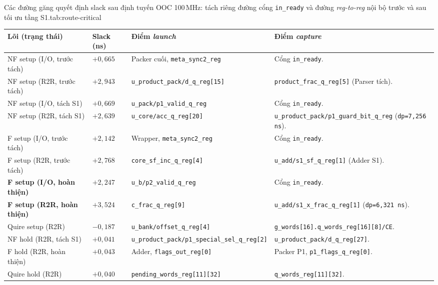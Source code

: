 \begin{engineeringtable}{Các đường găng quyết định slack sau định tuyến OOC 100\,MHz: tách riêng đường cổng \texttt{in\_ready} và đường \textit{reg-to-reg} nội bộ trước và sau tối ưu tầng S1.}{tab:route-critical}
\begin{tabularx}{\linewidth}{@{}>{\raggedright\arraybackslash}p{34mm}>{\raggedright\arraybackslash}p{15mm}Y Y@{}}
\toprule
Lõi (trạng thái) & Slack (ns) & Điểm \textit{launch} & Điểm \textit{capture} \\
\midrule
NF setup (I/O, trước tách) & $+0{,}665$ & Packer cuối, \texttt{meta\_sync2\_reg} & Cổng \texttt{in\_ready}. \\
NF setup (R2R, trước tách) & $+2{,}943$ & \texttt{u\_product\_pack/\allowbreak d\_q\_reg[15]} & \texttt{product\_frac\_\allowbreak q\_reg[5]} (Parser tích). \\
NF setup (I/O, tách S1) & $+0{,}669$ & \texttt{u\_pack/p1\_valid\_\allowbreak q\_reg} & Cổng \texttt{in\_ready}. \\
NF setup (R2R, tách S1) & $+2{,}639$ & \texttt{u\_core/acc\_q\_reg[20]} & \texttt{u\_product\_pack/\allowbreak p1\_guard\_bit\_q\_reg} (\texttt{dp=7,256\,ns}). \\
F setup (I/O, trước tách) & $+2{,}142$ & Wrapper, \texttt{meta\_sync2\_reg} & Cổng \texttt{in\_ready}. \\
F setup (R2R, trước tách) & $+2{,}768$ & \texttt{core\_sf\_\allowbreak inc\_q\_reg[4]} & \texttt{u\_add/\allowbreak s1\_sf\_q\_reg[1]} (Adder S1). \\
\textbf{F setup (I/O, hoàn thiện)} & \textbf{$+2{,}247$} & \texttt{u\_b/p2\_valid\_q\_reg} & Cổng \texttt{in\_ready}. \\
\textbf{F setup (R2R, hoàn thiện)} & \textbf{$+3{,}524$} & \texttt{c\_frac\_q\_reg[9]} & \texttt{u\_add/\allowbreak s1\_x\_frac\_q\_reg[1]} (\texttt{dp=6,321\,ns}). \\
Quire setup (R2R) & $-0{,}187$ & \texttt{u\_bank/\allowbreak offset\_q\_reg[4]} & \texttt{g\_words[16].\allowbreak q\_words\_reg[16][8]/CE}. \\
NF hold (R2R, tách S1) & $+0{,}041$ & \texttt{u\_product\_pack/\allowbreak p1\_special\_sel\_q\_reg[2]} & \texttt{u\_product\_pack/\allowbreak d\_q\_reg[27]}. \\
F hold (R2R, hoàn thiện) & $+0{,}043$ & Adder, \texttt{flags\_out\_reg[0]} & Packer P1, \texttt{p1\_flags\_q\_reg[0]}. \\
Quire hold (R2R) & $+0{,}040$ & \texttt{pending\_words\_\allowbreak reg[11][32]} & \texttt{q\_words\_\allowbreak reg[11][32]}. \\
\bottomrule
\end{tabularx}
\end{engineeringtable}

